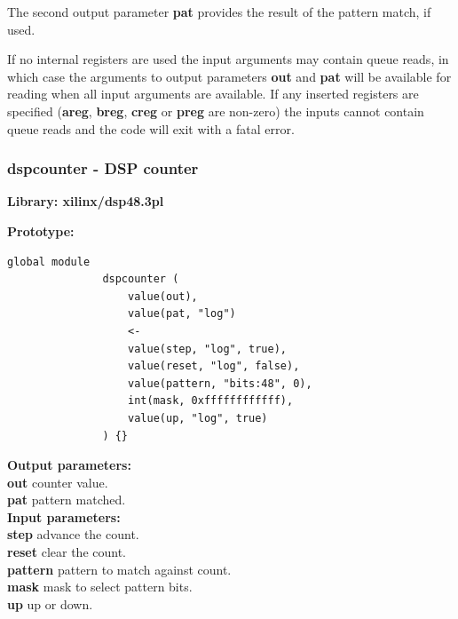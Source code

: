             The second output parameter {\bf pat} provides the result of the
            pattern match, if used.

            If no internal registers are used the input arguments may contain
            queue reads, in which case the arguments to output parameters {\bf
            out} and {\bf pat} will be available for reading when all input
            arguments are available. If any inserted registers are specified
            ({\bf areg}, {\bf breg}, {\bf creg} or {\bf preg} are
            non-zero) the inputs cannot contain queue reads and the code will
            exit with a fatal error.




        \subsubsection{dspcounter - DSP counter}\label{sec:lmdspcounter}

            {\bf Library: xilinx/dsp48.3pl}

            {\bf Prototype:} \\
            \vsp
            \begin{lstlisting}[gobble=12, language=threepl]
               global module
               dspcounter (
                   value(out),
                   value(pat, "log")
                   <-
                   value(step, "log", true),
                   value(reset, "log", false),
                   value(pattern, "bits:48", 0),
                   int(mask, 0xffffffffffff),
                   value(up, "log", true)
               ) {}
            \end{lstlisting}

            {\bf Output parameters:} \\
            {\bf out} counter value.\\
            {\bf pat} pattern matched.\\


            {\bf Input parameters:} \\
            {\bf step} advance the count.\\
            {\bf reset} clear the count.\\
            {\bf pattern} pattern to match against count.\\
            {\bf mask} mask to select pattern bits.\\
            {\bf up} up or down.\\

